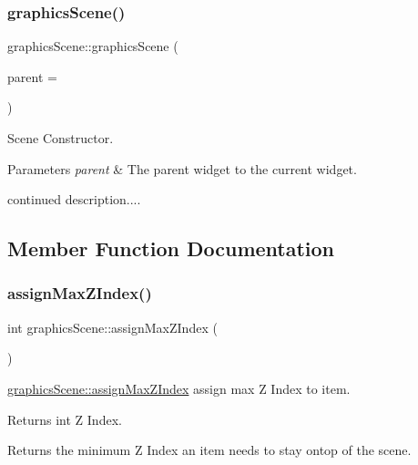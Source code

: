 \subsubsection{\texorpdfstring{graphics\+Scene()}{graphicsScene()}}
{\footnotesize\ttfamily graphics\+Scene\+::graphics\+Scene (\begin{DoxyParamCaption}\item[{Q\+Object $\ast$}]{parent = {} }\end{DoxyParamCaption})\hspace{0.3cm}{\ttfamily [explicit]}}



Scene Constructor. 


\begin{DoxyParams}{Parameters}
{\em parent} & The parent widget to the current widget.\\
\hline
\end{DoxyParams}
continued description.... 

\subsection{Member Function Documentation}
\mbox{\label{classgraphics_scene_a91aee253bbbf22a698685ad509945960}} 
\subsubsection{\texorpdfstring{assign\+Max\+Z\+Index()}{assignMaxZIndex()}}
{\footnotesize\ttfamily int graphics\+Scene\+::assign\+Max\+Z\+Index (\begin{DoxyParamCaption}{ }\end{DoxyParamCaption})}



\mbox{\hyperlink{classgraphics_scene_a91aee253bbbf22a698685ad509945960}{graphics\+Scene\+::assign\+Max\+Z\+Index}} assign max Z Index to item. 

\begin{DoxyReturn}{Returns}
int Z Index.
\end{DoxyReturn}
Returns the minimum Z Index an item needs to stay ontop of the scene. \mbox{\label{classgraphics_scene_aeb9feecebc1be01a976b14d6b20382d6}} 
